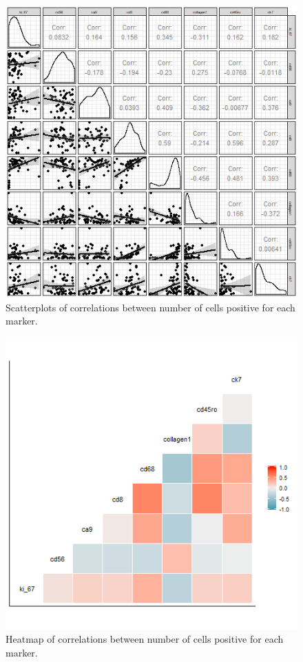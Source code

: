 \begin{figure}
    \centering
    \includegraphics{Chapter4/figs/Britroc_cell_correlation2.png}
    \caption{Scatterplots of correlations between number of cells positive for each marker.}
    \label{fig:britroc_corr_scatt}
\end{figure}

\begin{figure}
    \centering
    \includegraphics[width=\textwidth]{Chapter4/figs/Britroc_cell_correlation.png}
    \caption{Heatmap of correlations between number of cells positive for each marker.}
    \label{fig:britroc_corr_heat}
\end{figure}

